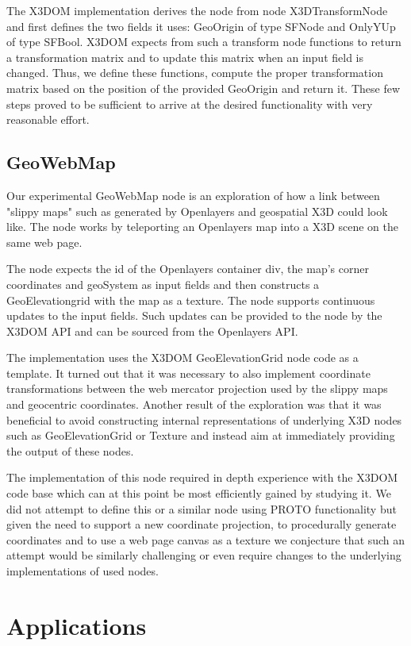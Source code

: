 \documentclass{acmsiggraph}                     %
\begin{document}
The X3DOM implementation derives the node from node X3DTransformNode and first defines the two fields it uses: GeoOrigin of type SFNode and OnlyYUp of type SFBool. X3DOM expects from such a transform node functions to return a transformation matrix and to update this matrix when an input field is changed. Thus, we define these functions, compute the proper transformation matrix based on the position of the provided GeoOrigin and return it. These few steps proved to be sufficient to arrive at the desired functionality with very reasonable effort.

\subsection{GeoWebMap}

Our experimental GeoWebMap node is an exploration of how a link between "slippy maps" such as generated by Openlayers \cite{OL15} and geospatial X3D could look like. The node works by teleporting an Openlayers map into a X3D scene on the same web page.

The node expects the id of the Openlayers container div, the map's corner coordinates and geoSystem as input fields and then constructs a GeoElevationgrid with the map as a texture. The node supports continuous updates to the input fields. Such updates can be provided to the node by the X3DOM API and can be sourced from the Openlayers API.

The implementation uses the X3DOM GeoElevationGrid node code as a template. It turned out that it was necessary to also implement coordinate transformations between the web mercator projection used by the slippy maps and geocentric coordinates. Another result of the exploration was that it was beneficial to avoid constructing internal representations of underlying X3D nodes such as GeoElevationGrid or Texture and instead aim at immediately providing the output of these nodes.

The implementation of this node required in depth experience with the X3DOM code base which can at this point be most efficiently gained by studying it. We did not attempt to define this or a similar node using PROTO functionality but given the need to support a new coordinate projection, to procedurally generate coordinates and to use a web page canvas as a texture we conjecture that such an attempt would be similarly challenging or even require changes to the underlying implementations of used nodes.  

\section{Applications}
\end{document}
